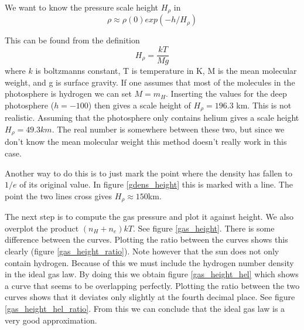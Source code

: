 \documentclass{aa}   %
\begin{document}
We want to know the pressure scale height $H_\rho$ in  
\begin{equation}
 \rho \approx \rho(0)exp(-h/H_{\rho})
\end{equation}

This can be found from the definition
\begin{equation}
 H_\rho = \frac{kT}{M g}
\end{equation}
where $k$ is boltzmanns constant, T is temperature in K, M is the mean molecular weight, and g is surface gravity.
If one assumes that most of the molecules in the photosphere is hydrogen we can set $M=m_H$. Inserting the values for the deep photosphere ($h = -100$) then gives a scale height of $H_\rho = 196.3$ km. This is not realistic. Assuming that the photosphere only contains helium gives a scale height $H_\rho = 49.3 km$. The real number is somewhere between these two, but since we don't know the mean molecular weight this method doesn't really work in this case.

Another way to do this is to just mark the point where the density has fallen to $1/e$ of its original value. In figure \ref{gdens_height} this is marked with a line. The point the two lines cross gives $H_\rho \approx 150 $km.

The next step is to compute the gas pressure and plot it against height. We also overplot the product $(n_H + n_e)kT$. See figure \ref{gas_height}. There is some difference between the curves. Plotting the ratio between the curves shows this clearly (figure \ref{gas_height_ratio}). Note however that the sun does not only contain hydrogen. Because of this we must include the hydrogen number density in the ideal gas law. By doing this we obtain figure \ref{gas_height_hel} which shows a curve that seems to be overlapping perfectly. Plotting the ratio between the two curves shows that it deviates only slightly at the fourth decimal place. See figure \ref{gas_height_hel_ratio}. From this we can conclude that the ideal gas law is a very good approximation.


\end{document}
